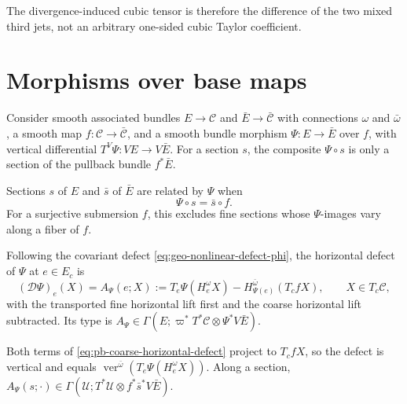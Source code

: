 The divergence-induced cubic tensor is therefore the difference of the two mixed third jets, not an
arbitrary one-sided cubic Taylor coefficient.

\section{Morphisms over base maps}
\label{sec:pb-coarse-naturality}

Consider smooth associated bundles \(E\to\mathcal C\) and \(\bar E\to\bar{\mathcal C}\) with
connections \(\omega\) and \(\bar\omega\), a smooth map \(f:\mathcal C\to\bar{\mathcal C}\), and a
smooth bundle morphism \(\Psi:E\to\bar E\) over \(f\), with vertical differential
\(T^V\Psi:VE\to V\bar E\). For a section \(s\), the composite \(\Psi\circ s\) is only a section of the
pullback bundle \(f^*\bar E\).

Sections \(s\) of \(E\) and \(\bar s\) of \(\bar E\) are related by \(\Psi\) when
\begin{equation}
\Psi\circ s=\bar s\circ f.
\label{eq:pb-coarse-related-sections}
\end{equation}
For a surjective submersion \(f\), this excludes fine sections whose \(\Psi\)-images vary along a
fiber of \(f\).

Following the covariant defect \eqref{eq:geo-nonlinear-defect-phi}, the horizontal defect of \(\Psi\)
at \(e\in E_c\) is
\begin{equation}
(\mathcal D\Psi)_e(X)
=A_\Psi(e;X)
:=T_e\Psi(H_e^\omega X)
-H_{\Psi(e)}^{\bar\omega}(T_cfX),
\qquad X\in T_c\mathcal C,
\label{eq:pb-coarse-horizontal-defect}
\end{equation}
with the transported fine horizontal lift first and the coarse horizontal lift subtracted. Its type is
\(A_\Psi\in\Gamma(E;\varpi^*T^*\mathcal C\otimes\Psi^*V\bar E)\).

Both terms of \eqref{eq:pb-coarse-horizontal-defect} project to \(T_cfX\), so the defect is vertical
and equals \(\operatorname{ver}^{\bar\omega}(T_e\Psi(H_e^\omega X))\). Along a section,
\(A_\Psi(s;\cdot)\in\Gamma(\mathcal U;T^*\mathcal U\otimes f^*\bar s^*V\bar E)\).

